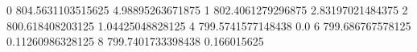0 804.5631103515625 4.98895263671875
1 802.4061279296875 2.83197021484375
2 800.618408203125 1.04425048828125
4 799.5741577148438 0.0
6 799.686767578125 0.11260986328125
8 799.7401733398438 0.166015625

